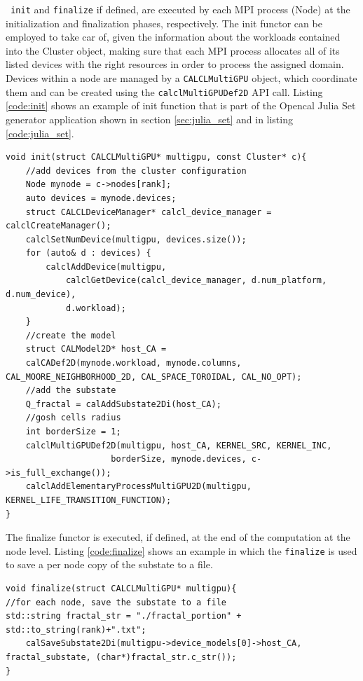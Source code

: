 {\texttt{ init} and \texttt{finalize} if defined, are executed by each MPI process (Node) at the initialization and finalization phases, respectively.
The init functor can be employed to take car of, given the information about the workloads contained into the Cluster object, making sure that each MPI process allocates all of its listed devices with the right resources in order to process the assigned domain.
Devices within a node are managed by a \texttt{CALCLMultiGPU} object,  which  coordinate them and can be created using the \texttt{calclMultiGPUDef2D} API call.
Listing \ref{code:init} shows an example of init function that is part of the Opencal Julia Set generator application shown in section \ref{sec:julia_set} and in listing \ref{code:julia_set}.
\begin{lstlisting}
void init(struct CALCLMultiGPU* multigpu, const Cluster* c){
	//add devices from the cluster configuration
	Node mynode = c->nodes[rank];
	auto devices = mynode.devices;
	struct CALCLDeviceManager* calcl_device_manager = calclCreateManager();
	calclSetNumDevice(multigpu, devices.size());
	for (auto& d : devices) {
		calclAddDevice(multigpu, 
			calclGetDevice(calcl_device_manager, d.num_platform, d.num_device),
			d.workload);
	}
	//create the model	
	struct CALModel2D* host_CA =
	calCADef2D(mynode.workload, mynode.columns, CAL_MOORE_NEIGHBORHOOD_2D, CAL_SPACE_TOROIDAL, CAL_NO_OPT);
	//add the substate
	Q_fractal = calAddSubstate2Di(host_CA);
	//gosh cells radius
	int borderSize = 1;
	calclMultiGPUDef2D(multigpu, host_CA, KERNEL_SRC, KERNEL_INC,
					 borderSize, mynode.devices, c->is_full_exchange());
	calclAddElementaryProcessMultiGPU2D(multigpu, 	KERNEL_LIFE_TRANSITION_FUNCTION);
}
\end{lstlisting}

The finalize functor is executed, if defined, at the end of the computation at the node level. Listing \ref{code:finalize} shows an example in which the \texttt{finalize} is used to save a per node copy of the substate to a file.
\begin{lstlisting}
void finalize(struct CALCLMultiGPU* multigpu){
//for each node, save the substate to a file
std::string fractal_str = "./fractal_portion" + std::to_string(rank)+".txt";
	calSaveSubstate2Di(multigpu->device_models[0]->host_CA, fractal_substate, (char*)fractal_str.c_str());
}
\end{lstlisting}

}
